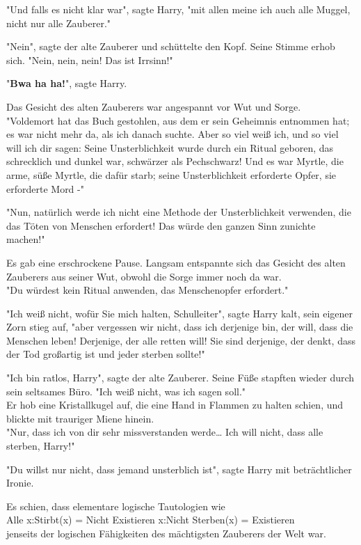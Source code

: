 {"Und falls es nicht klar war", sagte Harry, "mit allen meine ich auch alle Muggel, nicht nur alle Zauberer."

"Nein", sagte der alte Zauberer und schüttelte den Kopf. Seine Stimme erhob sich. "Nein, nein, nein! Das ist Irrsinn!"

"\textbf{Bwa ha ha!}", sagte Harry.

Das Gesicht des alten Zauberers war angespannt vor Wut und Sorge.\\ "Voldemort hat das Buch gestohlen, aus dem er sein Geheimnis entnommen hat; es war nicht mehr da, als ich danach suchte. Aber so viel weiß ich, und so viel will ich dir sagen: Seine Unsterblichkeit wurde durch ein Ritual geboren, das schrecklich und dunkel war, schwärzer als Pechschwarz! Und es war Myrtle, die arme, süße Myrtle, die dafür starb; seine Unsterblichkeit erforderte Opfer, sie erforderte Mord -"

"Nun, natürlich werde ich nicht eine Methode der Unsterblichkeit verwenden, die das Töten von Menschen erfordert! Das würde den ganzen Sinn zunichte machen!"

Es gab eine erschrockene Pause. Langsam entspannte sich das Gesicht des alten Zauberers aus seiner Wut, obwohl die Sorge immer noch da war.\\ "Du würdest kein Ritual anwenden, das Menschenopfer erfordert."

"Ich weiß nicht, wofür Sie mich halten, Schulleiter", sagte Harry kalt, sein eigener Zorn stieg auf, "aber vergessen wir nicht, dass ich derjenige bin, der will, dass die Menschen leben! Derjenige, der alle retten will! Sie sind derjenige, der denkt, dass der Tod großartig ist und jeder sterben sollte!"

"Ich bin ratlos, Harry", sagte der alte Zauberer. Seine Füße stapften wieder durch sein seltsames Büro. "Ich weiß nicht, was ich sagen soll."\\ Er hob eine Kristallkugel auf, die eine Hand in Flammen zu halten schien, und blickte mit trauriger Miene hinein.\\ "Nur, dass ich von dir sehr missverstanden werde… Ich will nicht, dass alle sterben, Harry!"

"Du willst nur nicht, dass jemand unsterblich ist", sagte Harry mit beträchtlicher Ironie.

Es schien, dass elementare logische Tautologien wie\\ Alle x:Stirbt(x) = Nicht Existieren x:Nicht Sterben(x) = Existieren\\ jenseits der logischen Fähigkeiten des mächtigsten Zauberers der Welt war.

}
